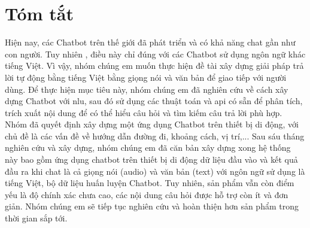 \chapter*{Tóm tắt}
\label{tomtat}
Hiện nay, các Chatbot trên thế giới đã phát triển và có khả năng chat gần như con người. Tuy nhiên , điều này chỉ đúng với các Chatbot sử dụng ngôn ngữ khác tiếng Việt. Vì vậy, nhóm chúng em muốn thực hiện đề tài xây dựng giải pháp trả lời tự động bằng tiếng Việt bằng giọng nói và văn bản để giao tiếp với người dùng. Để thực hiện mục tiêu này, nhóm chúng em đã nghiên cứu về cách xây dựng Chatbot với \ac{nlu}, sau đó sử dụng các thuật toán và \ac{api} có sẵn để phân tích, trích xuất nội dung để có thể hiểu câu hỏi và tìm kiếm câu trả lời phù hợp. Nhóm đã quyết định xây dựng một ứng dụng Chatbot trên thiết bị di động, với chủ đề là các vấn đề về hướng dẫn đường đi, khoảng cách, vị trí,... Sau sáu tháng nghiên cứu và xây dựng, nhóm chúng em đã căn bản xây dựng xong hệ thống này bao gồm ứng dụng chatbot trên thiết bị di động dữ liệu đầu vào và kết quả đầu ra khi chat là cả giọng nói (audio) và văn bản (text) với ngôn ngữ sử dụng là tiếng Việt, bộ dữ liệu huấn luyện Chatbot. Tuy nhiên, sản phẩm vẫn còn điểm yếu là độ chính xác chưa cao, các nội dung câu hỏi được hỗ trợ còn ít và đơn giản. Nhóm chúng em sẽ tiếp tục nghiên cứu và hoàn thiện hơn sản phẩm trong thời gian sắp tới. 


